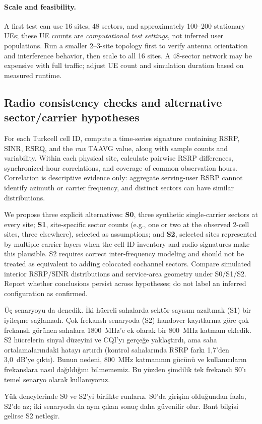 \documentclass[11pt,a4paper]{article}
\newenvironment{progress}{\par\smallskip\color{blue}}{\par\smallskip}
\begin{document}
\paragraph{Scale and feasibility.} A first test can use 16 sites, 48 sectors, and approximately 100--200 stationary UEs; these UE counts are \emph{computational test settings}, not inferred user populations. Run a smaller 2--3-site topology first to verify antenna orientation and interference behavior, then scale to all 16 sites. A 48-sector network may be expensive with full traffic; adjust UE count and simulation duration based on measured runtime.

\subsection{Radio consistency checks and alternative sector/carrier hypotheses}
For each Turkcell cell ID, compute a time-series signature containing RSRP, SINR, RSRQ, and the \emph{raw} TAAVG value, along with sample counts and variability. Within each physical site, calculate pairwise RSRP differences, synchronized-hour correlations, and coverage of common observation hours. Correlation is descriptive evidence only: aggregate serving-user RSRP cannot identify azimuth or carrier frequency, and distinct sectors can have similar distributions.

We propose three explicit alternatives: \textbf{S0}, three synthetic single-carrier sectors at every site; \textbf{S1}, site-specific sector counts (e.g., one or two at the observed 2-cell sites, three elsewhere), selected as assumptions; and \textbf{S2}, selected sites represented by multiple carrier layers when the cell-ID inventory and radio signatures make this plausible. S2 requires correct inter-frequency modeling and should not be treated as equivalent to adding colocated cochannel sectors. Compare simulated interior RSRP/SINR distributions and service-area geometry under S0/S1/S2. Report whether conclusions persist across hypotheses; do not label an inferred configuration as confirmed.

\begin{progress}
Üç senaryoyu da denedik. İki hücreli sahalarda sektör sayısını azaltmak (S1) bir iyileşme sağlamadı. Çok frekanslı senaryoda (S2) handover kayıtlarına göre çok frekanslı görünen sahalara 1800~MHz'e ek olarak bir 800~MHz katmanı ekledik. S2 hücrelerin sinyal düzeyini ve CQI'yı gerçeğe yaklaştırdı, ama saha ortalamalarındaki hatayı artırdı (kontrol sahalarında RSRP farkı 1,7'den 3,0~dB'ye çıktı). Bunun nedeni, 800~MHz katmanının gücünü ve kullanıcıların frekanslara nasıl dağıldığını bilmememiz. Bu yüzden şimdilik tek frekanslı S0'ı temel senaryo olarak kullanıyoruz.

Yük deneylerinde S0 ve S2'yi birlikte runlarız. S0'da girişim olduğundan fazla, S2'de az; iki senaryoda da aynı çıkan sonuç daha güvenilir olur. Bant bilgisi gelirse S2 netleşir.
\end{progress}
\end{document}
